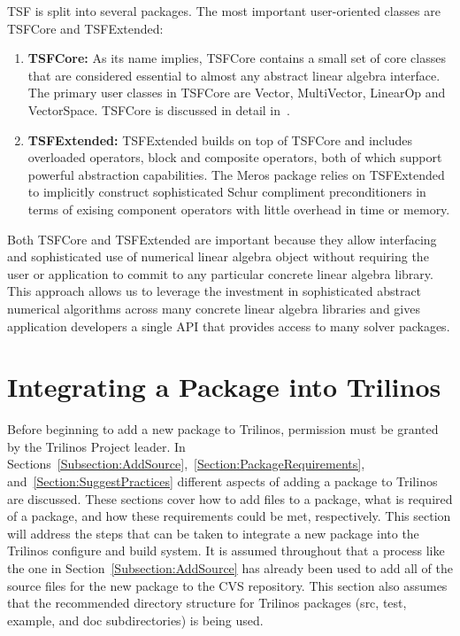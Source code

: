 \documentclass[12pt,strict]{TrilinosDevGuide}
\begin{document}
TSF is split into several packages.  The most important user-oriented
classes are TSFCore and TSFExtended:
\begin{enumerate}
\item {\bf TSFCore:} As its name implies, TSFCore contains a small set
of core classes that are considered essential to almost any abstract
linear algebra interface.  The primary user classes in TSFCore are
Vector, MultiVector, LinearOp and VectorSpace. TSFCore is discussed in
detail in~\cite{TSFCore}.
\item {\bf TSFExtended:} TSFExtended builds on top of TSFCore and
includes overloaded operators, block and composite operators, both of
which support powerful abstraction capabilities.  The Meros package
relies on TSFExtended to implicitly construct sophisticated
Schur compliment preconditioners in terms of exising component
operators with little overhead in time or memory.
\end{enumerate}

Both TSFCore and TSFExtended are important because they allow
interfacing and sophisticated use of numerical linear algebra object
without requiring the user or application to commit to any particular
concrete linear algebra library.  This approach allows us to leverage
the investment in sophisticated abstract numerical algorithms across
many concrete linear algebra libraries and gives application
developers a single API that provides access to many solver packages.


\section{Integrating a Package into Trilinos}
\label{Section:IntegratingPackages}
Before beginning to add a new package to Trilinos, permission must be 
granted by the Trilinos Project leader.  In 
Sections~\ref{Subsection:AddSource},~\ref{Section:PackageRequirements}, 
and~\ref{Section:SuggestPractices} different aspects of adding a package to 
Trilinos are discussed.  These sections cover how to add files to a package,
what is required of a package, and how these requirements could be met, 
respectively.  This section will address the steps that can be taken to 
integrate a new package into the Trilinos configure and build system.  It is 
assumed throughout that a process like the one in 
Section~\ref{Subsection:AddSource} has already been used to add all of the 
source files for the new package to the CVS repository.  This section also 
assumes that the recommended directory structure for Trilinos packages 
(src, test, example, and doc subdirectories) is being used.
\end{document}

